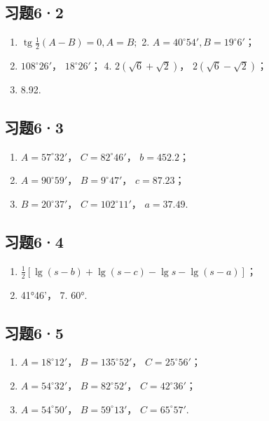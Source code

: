\subsection{习题6·2}

\begin{enumerate}
\item
  \(\operatorname{tg} \frac{1}{2} (A - B) = 0, A = B;\) 2.
  \(A = 40^{\circ}54', B = 19^{\circ}6'\)；
\item
  \(108^{\circ}26'\)， \(18^{\circ}26'\)； 4. \(2(\sqrt6+\sqrt2)\)，
  \(2(\sqrt{6} - \sqrt{2})\)；
\item
  8.92.
\end{enumerate}

\subsection{习题6·3}

\begin{enumerate}
\item
  \(A = 57^{\circ}32'\)， \(C = 82^{\circ}46'\)， \(b = 452.2\)；
\item
  \(A = 90^{\circ}59'\)， \(B = 9^{\circ}47'\)， \(c = 87.23\)；
\item
  \(B = 20^{\circ}37'\)， \(C = 102^{\circ}11'\)， \(a = 37.49\).
\end{enumerate}

\subsection{习题6·4}

\begin{enumerate}[start=5]
\item
  \(\frac{1}{2} [\lg (s - b) + \lg (s - c) - \lg s - \lg (s - a)]\)；
\item
  41°46'， 7. 60°.
\end{enumerate}

\subsection{习题6·5}

\begin{enumerate}
\item
  \(A = 18^{\circ}12'\)， \(B = 135^{\circ}52'\)，
  \(C = 25^{\circ}56'\)；
\item
  \(A = 54^{\circ}32'\)， \(B = 82^{\circ}52'\)，
  \(C = 42^{\circ}36'\)；
\item
  \(A = 54^{\circ}50'\)， \(B = 59^{\circ}13'\)， \(C = 65^{\circ}57'\).
\end{enumerate}

